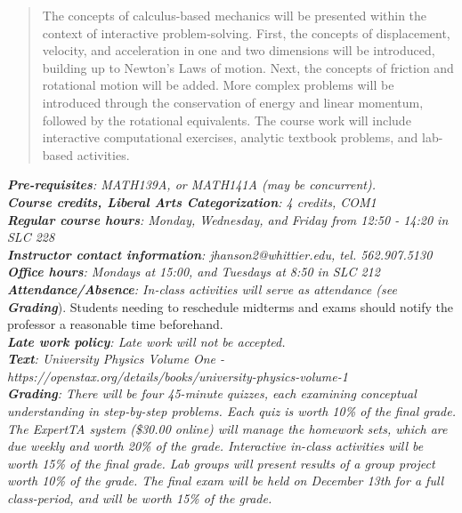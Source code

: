 \documentclass[10pt]{article}
\begin{document}
\maketitle

\begin{abstract}
The concepts of calculus-based mechanics will be presented within the context of interactive problem-solving.  First, the concepts of displacement, velocity, and acceleration in one and two dimensions will be introduced, building up to Newton's Laws of motion.  Next, the concepts of friction and rotational motion will be added.  More complex problems will be introduced through the conservation of energy and linear momentum, followed by the rotational equivalents.  The course work will include interactive computational exercises, analytic textbook problems, and lab-based activities.
\end{abstract}
\noindent
\textit{\textbf{Pre-requisites}: MATH139A, or MATH141A (may be concurrent).} \\
\textit{\textbf{Course credits, Liberal Arts Categorization}: 4 credits, COM1} \\
\textit{\textbf{Regular course hours}: Monday, Wednesday, and Friday from 12:50 - 14:20 in SLC 228} \\
\textit{\textbf{Instructor contact information}: jhanson2@whittier.edu, tel. 562.907.5130} \\
\textit{\textbf{Office hours}: Mondays at 15:00, and Tuesdays at 8:50 in SLC 212} \\
\textit{\textbf{Attendance/Absence}: In-class activities will serve as attendance (see \textit{\textbf{Grading}}}).  Students needing to reschedule midterms and exams should notify the professor a reasonable time beforehand. \\
\textit{\textbf{Late work policy}: Late work will not be accepted.} \\
\textit{\textbf{Text}: University Physics Volume One -  https://openstax.org/details/books/university-physics-volume-1} \\
\textit{\textbf{Grading}: There will be four 45-minute quizzes, each examining conceptual understanding in step-by-step problems.  Each quiz is worth 10\% of the final grade.  The ExpertTA system (\$30.00 online) will manage the homework sets, which are due weekly and worth 20\% of the grade.  Interactive in-class activities will be worth 15\% of the final grade.  Lab groups will present results of a group project worth 10\% of the grade. The final exam will be held on December 13th for a full class-period, and will be worth 15\% of the grade.} \\
\end{document}
